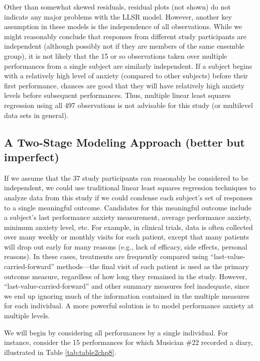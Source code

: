 \documentclass[
]{krantz}
\begin{document}
Other than somewhat skewed residuals, residual plots (not shown) do not indicate any major problems with the LLSR model. However, another key assumption in these models is the independence of all observations. While we might reasonably conclude that responses from different study participants are independent (although possibly not if they are members of the same ensemble group), it is not likely that the 15 or so observations taken over multiple performances from a single subject are similarly independent. If a subject begins with a relatively high level of anxiety (compared to other subjects) before their first performance, chances are good that they will have relatively high anxiety levels before subsequent performances. Thus, multiple linear least squares regression using all 497 observations is not advisable for this study (or multilevel data sets in general).

\hypertarget{twostage}{%
\subsection{A Two-Stage Modeling Approach (better but imperfect)}\label{twostage}}

If we assume that the 37 study participants can reasonably be considered to be independent, we could use traditional linear least squares regression techniques to analyze data from this study if we could condense each subject's set of responses to a single meaningful outcome. Candidates for this meaningful outcome include a subject's last performance anxiety measurement, average performance anxiety, minimum anxiety level, etc. For example, in clinical trials, data is often collected over many weekly or monthly visits for each patient, except that many patients will drop out early for many reasons (e.g., lack of efficacy, side effects, personal reasons). In these cases, treatments are frequently compared using ``last-value-carried-forward'' methods---the final visit of each patient is used as the primary outcome measure, regardless of how long they remained in the study. However, ``last-value-carried-forward'' and other summary measures feel inadequate, since we end up ignoring much of the information contained in the multiple measures for each individual. A more powerful solution is to model performance anxiety at multiple levels.

We will begin by considering all performances by a single individual. For instance, consider the 15 performances for which Musician \#22 recorded a diary, illustrated in Table \ref{tab:table2chp8}.
\end{document}
